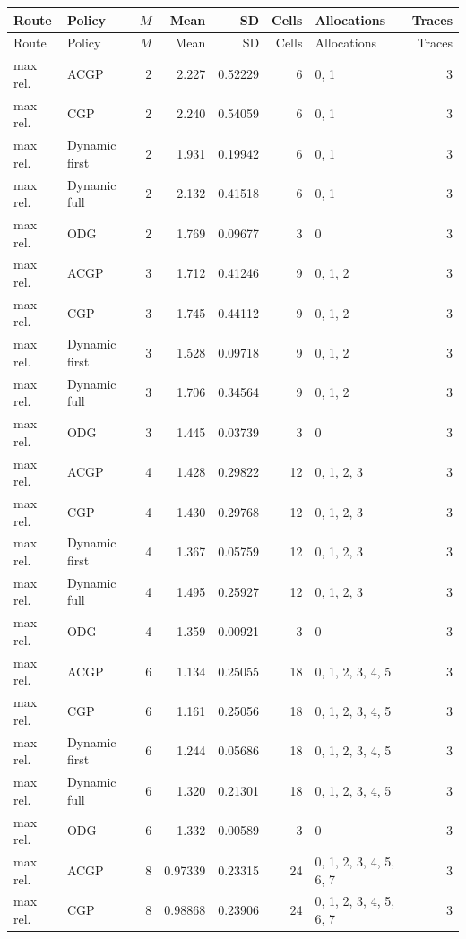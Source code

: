 \documentclass[10pt,a4paper]{article}
\begin{document}
\tiny\setlength{\tabcolsep}{2pt}\begin{longtable}{@{}p{23mm}p{29mm}rrrrp{36mm}r@{}}
\toprule Route & Policy & $M$ & Mean & SD & Cells & Allocations & Traces \\ \midrule\endfirsthead
\toprule Route & Policy & $M$ & Mean & SD & Cells & Allocations & Traces \\ \midrule\endhead
\bottomrule\endfoot
max rel. & ACGP & 2 & 2.227 & 0.52229 & 6 & 0, 1 & 3 \\
max rel. & CGP & 2 & 2.240 & 0.54059 & 6 & 0, 1 & 3 \\
max rel. & Dynamic first & 2 & 1.931 & 0.19942 & 6 & 0, 1 & 3 \\
max rel. & Dynamic full & 2 & 2.132 & 0.41518 & 6 & 0, 1 & 3 \\
max rel. & ODG & 2 & 1.769 & 0.09677 & 3 & 0 & 3 \\
max rel. & ACGP & 3 & 1.712 & 0.41246 & 9 & 0, 1, 2 & 3 \\
max rel. & CGP & 3 & 1.745 & 0.44112 & 9 & 0, 1, 2 & 3 \\
max rel. & Dynamic first & 3 & 1.528 & 0.09718 & 9 & 0, 1, 2 & 3 \\
max rel. & Dynamic full & 3 & 1.706 & 0.34564 & 9 & 0, 1, 2 & 3 \\
max rel. & ODG & 3 & 1.445 & 0.03739 & 3 & 0 & 3 \\
max rel. & ACGP & 4 & 1.428 & 0.29822 & 12 & 0, 1, 2, 3 & 3 \\
max rel. & CGP & 4 & 1.430 & 0.29768 & 12 & 0, 1, 2, 3 & 3 \\
max rel. & Dynamic first & 4 & 1.367 & 0.05759 & 12 & 0, 1, 2, 3 & 3 \\
max rel. & Dynamic full & 4 & 1.495 & 0.25927 & 12 & 0, 1, 2, 3 & 3 \\
max rel. & ODG & 4 & 1.359 & 0.00921 & 3 & 0 & 3 \\
max rel. & ACGP & 6 & 1.134 & 0.25055 & 18 & 0, 1, 2, 3, 4, 5 & 3 \\
max rel. & CGP & 6 & 1.161 & 0.25056 & 18 & 0, 1, 2, 3, 4, 5 & 3 \\
max rel. & Dynamic first & 6 & 1.244 & 0.05686 & 18 & 0, 1, 2, 3, 4, 5 & 3 \\
max rel. & Dynamic full & 6 & 1.320 & 0.21301 & 18 & 0, 1, 2, 3, 4, 5 & 3 \\
max rel. & ODG & 6 & 1.332 & 0.00589 & 3 & 0 & 3 \\
max rel. & ACGP & 8 & 0.97339 & 0.23315 & 24 & 0, 1, 2, 3, 4, 5, 6, 7 & 3 \\
max rel. & CGP & 8 & 0.98868 & 0.23906 & 24 & 0, 1, 2, 3, 4, 5, 6, 7 & 3 \\

\end{longtable}
\end{document}
